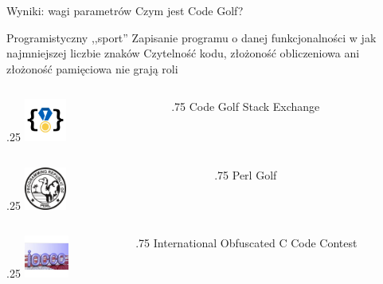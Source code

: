 \begin{frame}{Wyniki: wagi parametrów}
    Czym jest Code Golf?
    \begin{itemize}
        \myitem Programistyczny ,,sport''
        \myitem Zapisanie programu o danej funkcjonalności w jak najmniejszej liczbie znaków
        \myitem Czytelność kodu, złożoność obliczeniowa ani złożoność pamięciowa nie grają roli
    \end{itemize}

    \vspace*{0.3cm}

    \begin{columns}
        \begin{column}{.25\hsize}
            {\hspace*{0.7cm}\includegraphics[height=1.4cm]{figures/codegolf_logo.png}}
        \end{column}
        \begin{column}{.75\hsize}
            Code Golf Stack Exchange
        \end{column}
    \end{columns}

    \begin{columns}
        \begin{column}{.25\hsize}
            {\hspace*{0.7cm}\includegraphics[height=1.4cm]{figures/perl_logo.png}}
        \end{column}
        \begin{column}{.75\hsize}
            Perl Golf
        \end{column}
    \end{columns}

    \begin{columns}
        \begin{column}{.25\hsize}
            {\hspace*{0.7cm}\includegraphics[height=1.4cm]{figures/ioccc_logo.jpeg}}
        \end{column}
        \begin{column}{.75\hsize}
            International Obfuscated C Code Contest
        \end{column}
    \end{columns}

\end{frame}

